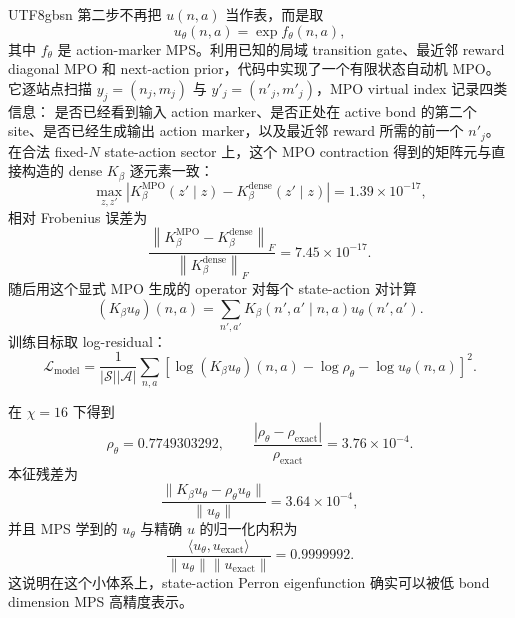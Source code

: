 \documentclass[11pt]{article}
\begin{document}
\begin{CJK*}{UTF8}{gbsn}
第二步不再把 \(u(n,a)\) 当作表，而是取
\begin{equation}
    u_\theta(n,a)=\exp f_\theta(n,a),
\end{equation}
其中 \(f_\theta\) 是 action-marker MPS。利用已知的局域 transition gate、最近邻 reward
diagonal MPO 和 next-action prior，代码中实现了一个有限状态自动机 MPO。它逐站点扫描
\(y_j=(n_j,m_j)\) 与 \(y'_j=(n'_j,m'_j)\)，MPO virtual index 记录四类信息：
是否已经看到输入 action marker、是否正处在 active bond 的第二个 site、是否已经生成输出
action marker，以及最近邻 reward 所需的前一个 \(n'_j\)。在合法 fixed-\(N\) state-action
sector 上，这个 MPO contraction 得到的矩阵元与直接构造的 dense \(K_\beta\) 逐元素一致：
\begin{equation}
    \max_{z,z'}
    \left|
        K_{\beta}^{\mathrm{MPO}}(z'\mid z)
        -
        K_{\beta}^{\mathrm{dense}}(z'\mid z)
    \right|
    =
    1.39\times 10^{-17},
\end{equation}
相对 Frobenius 误差为
\begin{equation}
    \frac{
    \left\|K_{\beta}^{\mathrm{MPO}}-K_{\beta}^{\mathrm{dense}}\right\|_F
    }{
    \left\|K_{\beta}^{\mathrm{dense}}\right\|_F
    }
    =
    7.45\times 10^{-17}.
\end{equation}
随后用这个显式 MPO 生成的 operator 对每个 state-action 对计算
\begin{equation}
    (K_\beta u_\theta)(n,a)
    =
    \sum_{n',a'}
    K_\beta(n',a'\mid n,a)u_\theta(n',a').
\end{equation}
训练目标取 log-residual：
\begin{equation}
    \mathcal L_{\mathrm{model}}
    =
    \frac{1}{|\mathcal S||\mathcal A|}
    \sum_{n,a}
    \left[
        \log (K_\beta u_\theta)(n,a)
        -
        \log \rho_\theta
        -
        \log u_\theta(n,a)
    \right]^2.
\end{equation}

在 \(\chi=16\) 下得到
\begin{equation}
    \rho_{\theta}=0.7749303292,
    \qquad
    \frac{|\rho_\theta-\rho_{\mathrm{exact}}|}{\rho_{\mathrm{exact}}}
    =
    3.76\times 10^{-4}.
\end{equation}
本征残差为
\begin{equation}
    \frac{\|K_\beta u_\theta-\rho_\theta u_\theta\|}{\|u_\theta\|}
    =
    3.64\times 10^{-4},
\end{equation}
并且 MPS 学到的 \(u_\theta\) 与精确 \(u\) 的归一化内积为
\begin{equation}
    \frac{\langle u_\theta,u_{\mathrm{exact}}\rangle}
    {\|u_\theta\|\|u_{\mathrm{exact}}\|}
    =
    0.9999992.
\end{equation}
这说明在这个小体系上，state-action Perron eigenfunction 确实可以被低 bond dimension MPS
高精度表示。


\end{CJK*}
\end{document}
